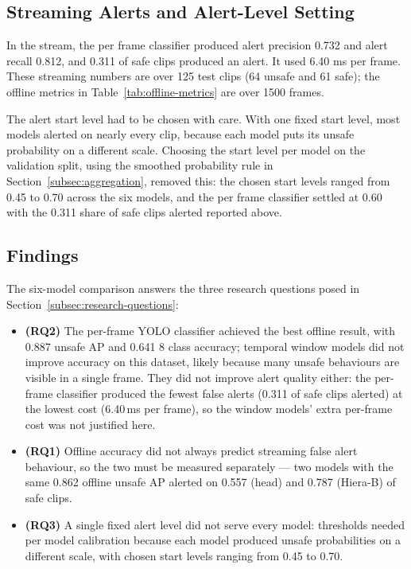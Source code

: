 \documentclass[conference]{IEEEtran}
\begin{document}
\subsection{Streaming Alerts and Alert-Level Setting}
\label{subsec:streaming-alerts}

In the stream, the per frame classifier produced alert precision 0.732
and alert recall 0.812, and 0.311 of safe clips produced an alert. It
used 6.40 ms per frame. These streaming numbers are over 125 test clips
(64 unsafe and 61 safe); the offline metrics in
Table~\ref{tab:offline-metrics} are over 1500 frames.

The alert start level had to be chosen with care. With one fixed start
level, most models alerted on nearly every clip, because each model puts
its unsafe probability on a different scale. Choosing the start level per
model on the validation split, using the smoothed probability rule in
Section~\ref{subsec:aggregation}, removed this: the chosen start levels
ranged from 0.45 to 0.70 across the six models, and the per frame
classifier settled at 0.60 with the 0.311 share of safe clips alerted
reported above.

\subsection{Findings}
\label{subsec:findings}

The six-model comparison answers the three research questions posed in
Section~\ref{subsec:research-questions}:
\begin{itemize}
\item \textbf{(RQ2)} The per-frame YOLO classifier achieved the best offline
result, with 0.887 unsafe AP and 0.641 8 class accuracy; temporal window models
did not improve accuracy on this dataset, likely because many unsafe behaviours
are visible in a single frame. They did not improve alert quality either: the
per-frame classifier produced the fewest false alerts (0.311 of safe clips
alerted) at the lowest cost (6.40\,ms per frame), so the window models' extra
per-frame cost was not justified here.
\item \textbf{(RQ1)} Offline accuracy did not always predict streaming
false alert behaviour, so the two must be measured separately --- two models with
the same 0.862 offline unsafe AP alerted on 0.557 (head) and 0.787 (Hiera-B) of
safe clips.
\item \textbf{(RQ3)} A single fixed alert level did not serve every model:
thresholds needed per model calibration because each model produced unsafe
probabilities on a different scale, with chosen start levels ranging from 0.45
to 0.70.
\end{itemize}
\end{document}
